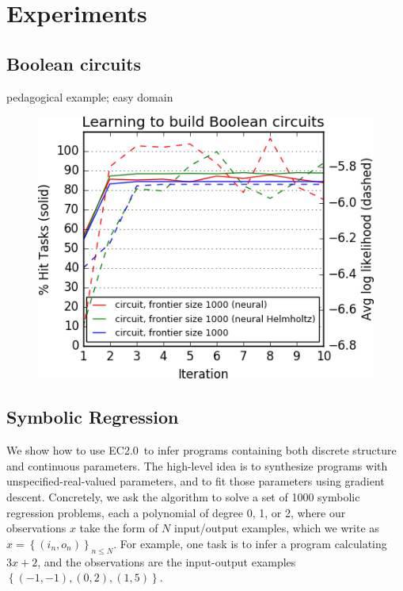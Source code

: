 \documentclass{article}
\newcommand{\system}{EC2.0~}
\begin{document}



\section{Experiments}

\subsection{Boolean circuits}
pedagogical example; easy domain
\begin{figure}
  \includegraphics[width = \columnwidth]{figures/circuit.png} 
\end{figure}

\subsection{Symbolic Regression}\label{regressionSection}
We show how to use \system to infer programs containing both discrete
structure and continuous parameters. The high-level idea is to synthesize programs with unspecified-real-valued parameters, and to fit those parameters using gradient descent.
Concretely, we ask the algorithm to
solve a set of 1000 symbolic regression problems, each a polynomial of
degree 0, 1, or 2, where our observations $x$ take the form of $N$
input/output examples, which we write as $x = \left\{(i_n,o_n)
\right\}_{n\leq N}$. For example, one task is to infer a program
calculating $3x + 2$, and the observations are the input-output
examples $\left\{(-1,-1),(0,2),(1,5) \right\}$.
\end{document}
